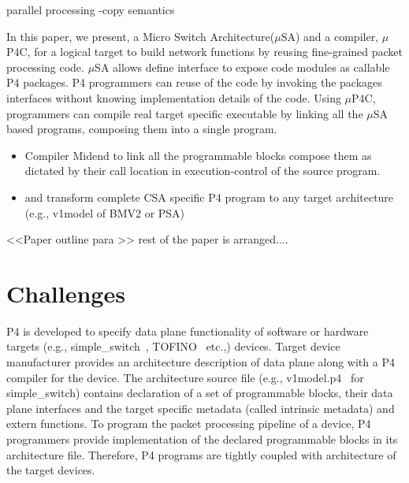 \documentclass[10pt,sigconf,letterpaper,anonymous]{acmart}
\begin{document}
parallel processing -copy semantics


In this paper, we present, a Micro Switch Architecture($\mu$SA) and a compiler, $\mu$P4C, for a logical target to build network functions by reusing fine-grained packet processing code.
$\mu$SA allows define interface to expose code modules as callable P4 packages.
P4 programmers can reuse of the code by invoking the packages interfaces without knowing implementation details of the code.
Using $\mu$P4C, programmers can compile real target specific executable by linking all the $\mu$SA based programs, composing them into a single program.
\begin{itemize}
 \item Compiler Midend to link all the programmable blocks compose them as dictated by their call location in execution-control of the source program.
 \item and transform complete CSA specific P4 program to any target architecture (e.g., v1model of BMV2 or PSA)
\end{itemize}

%  
% 
%  
%  
%  

<<Paper outline para  >> rest of the paper is arranged....



\section{Challenges}
P4 is developed to specify data plane functionality of software or hardware targets (e.g., simple\_\-switch~\cite{simple_switch.md}, TOFINO~\cite{tofino} etc.,) devices.
Target device manufacturer provides an architecture description of data plane along with a P4 compiler for the device.
The architecture source file (e.g., v1model.p4~\cite{v1model.p4} for simple\_switch) contains declaration of a set of pro\-gram\-ma\-ble blocks, their data plane interfaces and the target specific metadata (called intrinsic metadata) and extern functions.
To program the packet processing pipeline of a device, P4 programmers provide implementation of the declared programmable blocks in its architecture file.
Therefore, P4 programs are tightly coupled with architecture of the target devices.
\end{document}
